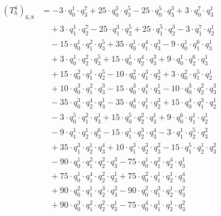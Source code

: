 \begin{align*}(T_{h}^4)_{6,8}&=-3\cdot q_0^{1}\cdot q_3^{7}+25\cdot q_0^{3}\cdot q_3^{5}-25\cdot q_0^{5}\cdot q_3^{3}+3\cdot q_0^{7}\cdot q_3^{1}\\
&\quad +3\cdot q_1^{1}\cdot q_2^{7}-25\cdot q_1^{3}\cdot q_2^{5}+25\cdot q_1^{5}\cdot q_2^{3}-3\cdot q_1^{7}\cdot q_2^{1}\\
&\quad -15\cdot q_0^{1}\cdot q_1^{2}\cdot q_3^{5}+35\cdot q_0^{1}\cdot q_1^{4}\cdot q_3^{3}-9\cdot q_0^{1}\cdot q_1^{6}\cdot q_3^{1}\\
&\quad +3\cdot q_0^{1}\cdot q_2^{2}\cdot q_3^{5}+15\cdot q_0^{1}\cdot q_2^{4}\cdot q_3^{3}+9\cdot q_0^{1}\cdot q_2^{6}\cdot q_3^{1}\\
&\quad +15\cdot q_0^{2}\cdot q_1^{1}\cdot q_2^{5}-10\cdot q_0^{2}\cdot q_1^{3}\cdot q_2^{3}+3\cdot q_0^{2}\cdot q_1^{5}\cdot q_2^{1}\\
&\quad +10\cdot q_0^{3}\cdot q_1^{2}\cdot q_3^{3}-15\cdot q_0^{3}\cdot q_1^{4}\cdot q_3^{1}-10\cdot q_0^{3}\cdot q_2^{2}\cdot q_3^{3}\\
&\quad -35\cdot q_0^{3}\cdot q_2^{4}\cdot q_3^{1}-35\cdot q_0^{4}\cdot q_1^{1}\cdot q_2^{3}+15\cdot q_0^{4}\cdot q_1^{3}\cdot q_2^{1}\\
&\quad -3\cdot q_0^{5}\cdot q_1^{2}\cdot q_3^{1}+15\cdot q_0^{5}\cdot q_2^{2}\cdot q_3^{1}+9\cdot q_0^{6}\cdot q_1^{1}\cdot q_2^{1}\\
&\quad -9\cdot q_1^{1}\cdot q_2^{1}\cdot q_3^{6}-15\cdot q_1^{1}\cdot q_2^{3}\cdot q_3^{4}-3\cdot q_1^{1}\cdot q_2^{5}\cdot q_3^{2}\\
&\quad +35\cdot q_1^{3}\cdot q_2^{1}\cdot q_3^{4}+10\cdot q_1^{3}\cdot q_2^{3}\cdot q_3^{2}-15\cdot q_1^{5}\cdot q_2^{1}\cdot q_3^{2}\\
&\quad -90\cdot q_0^{1}\cdot q_1^{2}\cdot q_2^{2}\cdot q_3^{3}-75\cdot q_0^{1}\cdot q_1^{2}\cdot q_2^{4}\cdot q_3^{1}\\
&\quad +75\cdot q_0^{1}\cdot q_1^{4}\cdot q_2^{2}\cdot q_3^{1}+75\cdot q_0^{2}\cdot q_1^{1}\cdot q_2^{1}\cdot q_3^{4}\\
&\quad +90\cdot q_0^{2}\cdot q_1^{1}\cdot q_2^{3}\cdot q_3^{2}-90\cdot q_0^{2}\cdot q_1^{3}\cdot q_2^{1}\cdot q_3^{2}\\
&\quad +90\cdot q_0^{3}\cdot q_1^{2}\cdot q_2^{2}\cdot q_3^{1}-75\cdot q_0^{4}\cdot q_1^{1}\cdot q_2^{1}\cdot q_3^{2}\end{align*}
